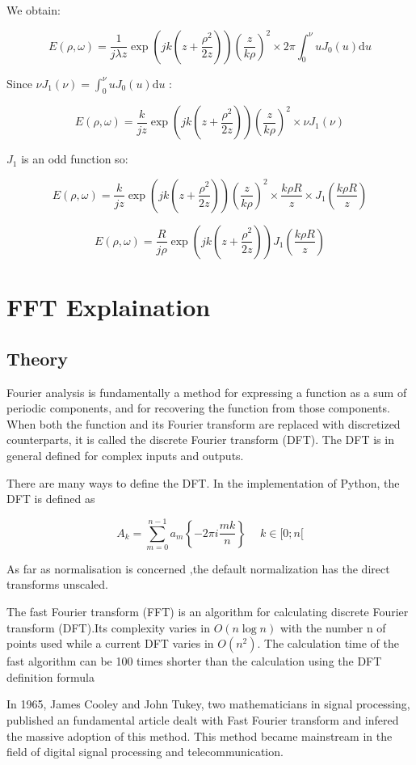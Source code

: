 \documentclass[10pt,a4paper]{article}
\begin{document}
We obtain:

\[
E(\rho,\omega)=\frac{1}{j\lambda z} \exp\left(jk\left(z+\frac{\rho^2}{2z}\right)\right)
\left(\frac{z}{k\rho}\right)^2
\times 2\pi \int_0^\nu u J_0(u) \mathrm{d}u
\]


Since $\nu J_1(\nu)=\int_0^\nu u J_0(u) \mathrm{d}u$  :

\[
E(\rho,\omega)=\frac{k}{jz} \exp\left(jk\left(z+\frac{\rho^2}{2z}\right)\right)
\left(\frac{z}{k\rho}\right)^2
\times \nu J_1(\nu)
\]

$J_1$ is an odd function so:

\[
E(\rho,\omega)=\frac{k}{jz} \exp\left(jk\left(z+\frac{\rho^2}{2z}\right)\right)
\left(\frac{z}{k\rho}\right)^2
\times \frac{k\rho R}{z} \times J_1\left(\frac{k\rho R}{z}\right)
\]

\[
E(\rho,\omega)=\frac{R}{j\rho} \exp\left(jk\left(z+\frac{\rho^2}{2z}\right)\right)
J_1\left(\frac{k\rho R}{z}\right)
\]

\section{FFT Explaination}
	\subsection{Theory}
Fourier analysis is fundamentally a method for expressing a function as a sum of periodic components, and for recovering the function from those components. When both the function and its Fourier transform are replaced with discretized counterparts, it is called the discrete Fourier transform (DFT). The DFT is in general defined for complex inputs and outputs. 

There are many ways to define the DFT. In the implementation of Python, the DFT is defined as

\[A_k=\sum_{m=0}^{n-1}a_m\left\lbrace-2\pi i\frac{mk}{n}\right\rbrace\
\quad
k\in[0;n[\]

As far as normalisation is concerned ,the default normalization has the direct transforms unscaled. 

The fast Fourier transform (FFT) is an algorithm for calculating discrete Fourier transform (DFT).Its complexity varies in $O(n\log n)$ with the number n of points used while a current DFT varies in $O(n^2)$. The calculation time of the fast algorithm can be 100 times shorter than the calculation using the DFT definition formula 

In 1965, James Cooley and John Tukey, two mathematicians in signal processing, published an fundamental article dealt with Fast Fourier transform and infered the massive adoption of this method. This method became mainstream in the field of digital signal processing and telecommunication.  
\end{document}
